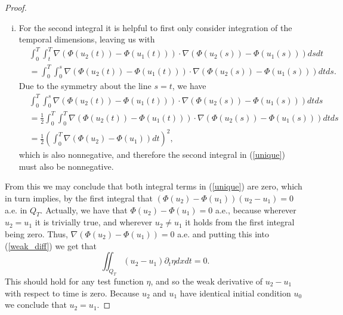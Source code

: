 \documentclass[11pt, a4paper]{article}
\begin{document}
\begin{proof}
\begin{enumerate}[i)]
	\item For the second integral it is helpful to first only consider integration of the temporal dimensions, leaving us with
	\begin{align*}
	&\int_0^T\int_t^T \nabla(\Phi(u_2(t)) - \Phi(u_1(t)))\cdot \nabla(\Phi(u_2(s))-\Phi(u_1(s)))dsdt \\
	&= \int_0^T\int_0^s\nabla(\Phi(u_2(t)) - \Phi(u_1(t)))\cdot \nabla(\Phi(u_2(s))-\Phi(u_1(s)))dtds.
	\end{align*}
	Due to the symmetry about the line $s=t$, we have
	\begin{align*}
	&\int_0^T\int_0^s\nabla(\Phi(u_2(t)) - \Phi(u_1(t)))\cdot \nabla(\Phi(u_2(s))-\Phi(u_1(s)))dtds \\
	&= \frac{1}{2}\int_0^T \int_0^T \nabla(\Phi(u_2(t)) - \Phi(u_1(t)))\cdot \nabla(\Phi(u_2(s))-\Phi(u_1(s)))dtds \\
	&= \frac{1}{2}\left( \int_0^T \nabla(\Phi(u_2)-\Phi(u_1))dt\right)^2,
	\end{align*}
	which is also nonnegative, and therefore the second integral in (\ref{unique}) must also be nonnegative.
\end{enumerate}
From this we may conclude that both integral terms in (\ref{unique}) are zero, which in turn implies, by the first integral that $(\Phi(u_2)-\Phi(u_1))(u_2 - u_1) = 0$ a.e. in $Q_T$. Actually, we have that $\Phi(u_2) - \Phi(u_1) = 0$ a.e., because wherever $u_2 = u_1$ it is trivially true, and wherever $ u_2 \neq u_1$ it holds from the first integral being zero. Thus, $ \nabla (\Phi(u_2) - \Phi(u_1) ) = 0$ a.e. and putting this into (\ref{weak_diff}) we get that
\begin{equation*}
\iint_{Q_T}(u_2 - u_1)\partial_t \eta dx dt = 0.
\end{equation*}
This should hold for any test function $\eta$, and so the weak derivative of $u_2 - u_1$ with respect to time is zero. Because $u_2$ and $u_1$ have identical initial condition $u_0$ we conclude that $u_2 = u_1$.
\end{proof}
\end{document}
